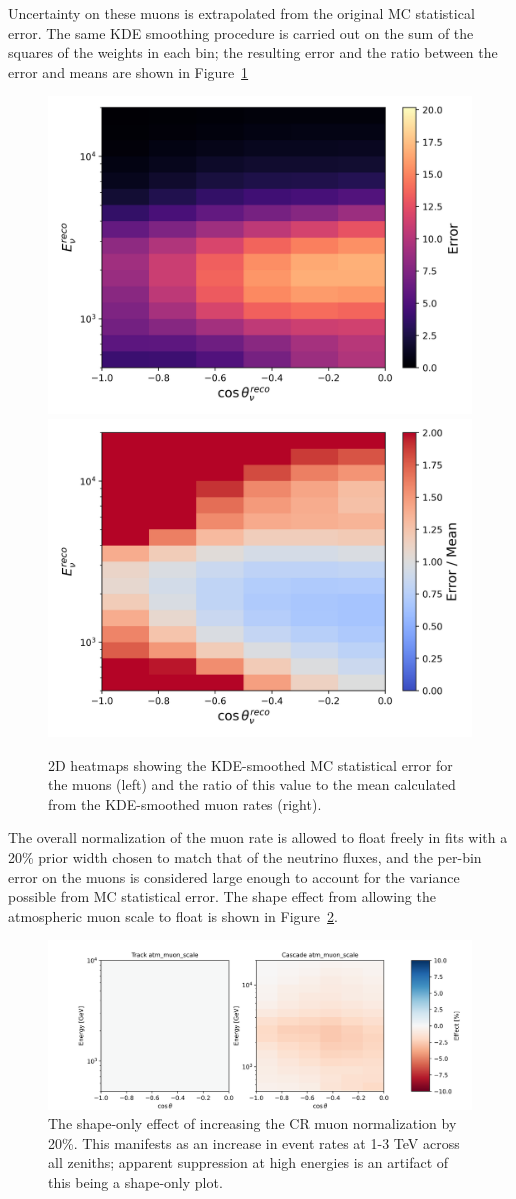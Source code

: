 \documentclass[main.tex]{subfiles}
\begin{document}
Uncertainty on these muons is extrapolated from the original MC statistical error. 
The same KDE smoothing procedure is carried out on the sum of the squares of the weights in each bin; the resulting error and the ratio between the error and means are shown in Figure~\ref{fig:muonmuonerr}

\begin{figure}
    \centering
    \includegraphics[width=0.45\linewidth]{figures/kde_muons_error.png}%
    \includegraphics[width=0.45\linewidth]{figures/kde_muons_error_ratio.png}
    \caption{2D heatmaps showing the KDE-smoothed MC statistical error for the muons (left) and the ratio of this value to the mean calculated from the KDE-smoothed muon rates (right).}\label{fig:muonmuonerr}
\end{figure}

The overall normalization of the muon rate is allowed to float freely in fits with a 20\% prior width chosen to match that of the neutrino fluxes, and the per-bin error on the muons is considered large enough to account for the variance possible from MC statistical error.
The shape effect from allowing the atmospheric muon scale to float is shown in Figure~\ref{fig:muon_shape}.

\begin{figure}
    \centering
    \includegraphics[width=0.8\linewidth]{figures/systematics/atm_muon_scale.png}
    \caption{The shape-only effect of increasing the CR muon normalization by 20\%. This manifests as an increase in event rates at 1-3 TeV across all zeniths; apparent suppression at high energies is an artifact of this being a shape-only plot.}\label{fig:muon_shape}
\end{figure}
\end{document}
